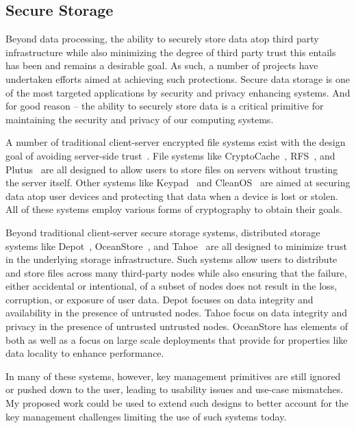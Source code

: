\subsection{Secure Storage}

Beyond data processing, the ability to securely store data atop third
party infrastructure while also minimizing the degree of third party
trust this entails has been and remains a desirable goal. As such, a
number of projects have undertaken efforts aimed at achieving such
protections. Secure data storage is one of the most targeted
applications by security and privacy enhancing systems. And for good
reason -- the ability to securely store data is a critical primitive
for maintaining the security and privacy of our computing systems.

A number of traditional client-server encrypted file systems exist
with the design goal of avoiding server-side
trust~\cite{kher2005}. File systems like
CryptoCache~\cite{jensen2000}, RFS~\cite{dong2011}, and
Plutus~\cite{kallahalla2003} are all designed to allow users to store
files on servers without trusting the server itself. Other systems
like Keypad~\cite{geambasu2011} and CleanOS~\cite{tang2012} are aimed
at securing data atop user devices and protecting that data when a
device is lost or stolen. All of these systems employ various forms of
cryptography to obtain their goals.
 
Beyond traditional client-server secure storage systems, distributed
storage systems like Depot~\cite{mahajan2011},
OceanStore~\cite{kubiatowicz2000}, and Tahoe~\cite{wilcox-o'hearn2008}
are all designed to minimize trust in the underlying storage
infrastructure. Such systems allow users to distribute and store files
across many third-party nodes while also ensuring that the failure,
either accidental or intentional, of a subset of nodes does not result
in the loss, corruption, or exposure of user data. Depot focuses on
data integrity and availability in the presence of untrusted
nodes. Tahoe focus on data integrity and privacy in the presence of
untrusted untrusted nodes. OceanStore has elements of both as well as
a focus on large scale deployments that provide for properties like
data locality to enhance performance.

In many of these systems, however, key management primitives are still
ignored or pushed down to the user, leading to usability issues and
use-case mismatches. My proposed work could be used to extend such
designs to better account for the key management challenges limiting
the use of such systems today.


